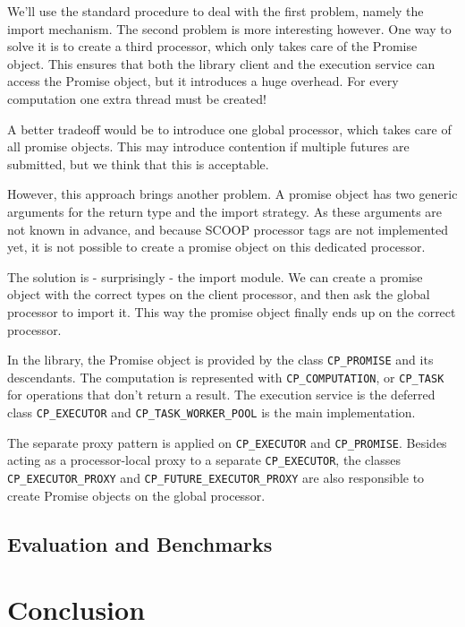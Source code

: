 \documentclass[a4paper,10pt]{report}
\begin{document}
We'll use the standard procedure to deal with the first problem, namely the import mechanism.
The second problem is more interesting however.
One way to solve it is to create a third processor, which only takes care of the Promise object.
This ensures that both the library client and the execution service can access the Promise object, but it introduces a huge overhead.
For every computation one extra thread must be created!

A better tradeoff would be to introduce one global processor, which takes care of all promise objects.
This may introduce contention if multiple futures are submitted, but we think that this is acceptable.

However, this approach brings another problem.
A promise object has two generic arguments for the return type and the import strategy.
As these arguments are not known in advance, and because SCOOP processor tags  are not implemented yet, it is not possible to create a promise object on this dedicated processor.

The solution is - surprisingly - the import module.
We can create a promise object with the correct types on the client processor, and then ask the global processor to import it.
This way the promise object finally ends up on the correct processor.

In the library, the Promise object is provided by the class \lstinline!CP_PROMISE! and its descendants.
The computation is represented with \lstinline!CP_COMPUTATION!, or \lstinline!CP_TASK! for operations that don't return a result.
The execution service is the deferred class \lstinline!CP_EXECUTOR! and \lstinline!CP_TASK_WORKER_POOL! is the main implementation.

The separate proxy pattern is applied on \lstinline!CP_EXECUTOR! and \lstinline!CP_PROMISE!.
Besides acting as a processor-local proxy to a separate \lstinline!CP_EXECUTOR!, 
the classes \lstinline!CP_EXECUTOR_PROXY! and \lstinline!CP_FUTURE_EXECUTOR_PROXY! are also responsible to create Promise objects on the global processor.

\subsection{Evaluation and Benchmarks}


\section{Conclusion}

\todos
\end{document}
